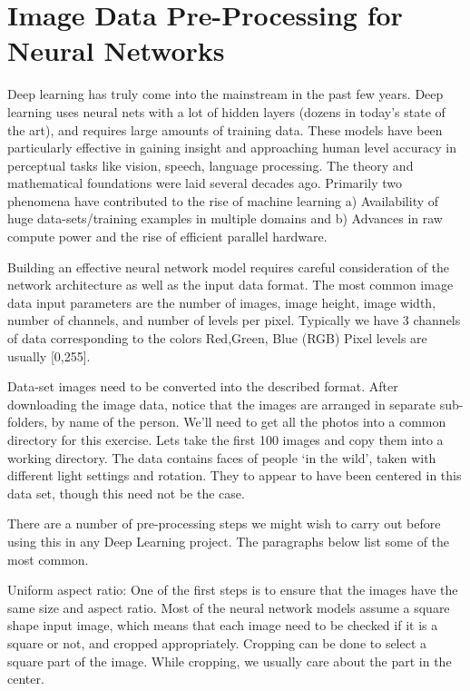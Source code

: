 \documentclass[../main.tex]{subfiles}
\begin{document}
\thispagestyle{empty}
\section{Image Data Pre-Processing for Neural Networks}
Deep learning has truly come into the mainstream in the past few years. Deep learning uses neural nets with a lot of hidden layers (dozens in today’s state of the art), and requires large amounts of training data. These models have been particularly effective in gaining insight and approaching human level accuracy in perceptual tasks like vision, speech, language processing. The theory and mathematical foundations were laid several decades ago. Primarily two phenomena have contributed to the rise of machine learning a) Availability of huge data-sets/training examples in multiple domains and b) Advances in raw compute power and the rise of efficient parallel hardware.

Building an effective neural network model requires careful consideration of the network architecture as well as the input data format. The most common image data input parameters are the number of images, image height, image width, number of channels, and number of levels per pixel. Typically we have 3 channels of data corresponding to the colors Red,Green, Blue (RGB) Pixel levels are usually [0,255].

Data-set images need to be converted into the described format. After downloading the image data, notice that the images are arranged in separate sub-folders, by name of the person. We’ll need to get all the photos into a common directory for this exercise. Lets take the first 100 images and copy them into a working directory. The data contains faces of people ‘in the wild’, taken with different light settings and rotation. They to appear to have been centered in this data set, though this need not be the case.


There are a number of pre-processing steps we might wish to carry out before using this in any Deep Learning project. The paragraphs below list some of the most common.

Uniform aspect ratio: One of the first steps is to ensure that the images have the same size and aspect ratio. Most of the neural network models assume a square shape input image, which means that each image need to be checked if it is a square or not, and cropped appropriately. Cropping can be done to select a square part of the image. While cropping, we usually care about the part in the center.
\end{document}
